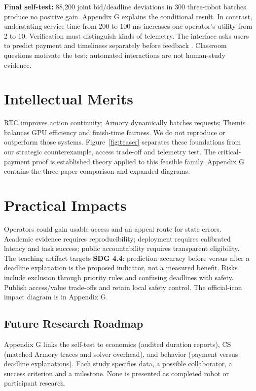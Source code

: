 \textbf{Final self-test:} 88,200 joint bid/deadline deviations in 300 three-robot batches produce no positive gain. Appendix G explains the conditional result. In contrast, understating service time from 200 to 100 ms increases one operator's utility from 2 to 10. Verification must distinguish kinds of telemetry. The interface asks users to predict payment and timeliness separately before feedback \cite{hassidim}. Classroom questions motivate the test; automated interactions are not human-study evidence.

\balance
\section{Intellectual Merits}
RTC improves action continuity; Armory dynamically batches requests; Themis balances GPU efficiency and finish-time fairness. We do not reproduce or outperform those systems. Figure~\ref{fig:teaser} separates these foundations from our strategic counterexample, access trade-off and telemetry test. The critical-payment proof is established theory applied to this feasible family. Appendix G contains the three-paper comparison and expanded diagrams.

\section{Practical Impacts}
Operators could gain usable access and an appeal route for state errors. Academic evidence requires reproducibility; deployment requires calibrated latency and task success; public accountability requires transparent eligibility. The teaching artifact targets \textbf{SDG 4.4}: prediction accuracy before versus after a deadline explanation is the proposed indicator, not a measured benefit. Risks include exclusion through priority rules and confusing deadlines with safety. Publish access/value trade-offs and retain local safety control. The official-icon impact diagram is in Appendix G.

\subsection*{Future Research Roadmap}
Appendix G links the self-test to economics (audited duration reports), CS (matched Armory traces and solver overhead), and behavior (payment versus deadline explanations). Each study specifies data, a possible collaborator, a success criterion and a milestone. None is presented as completed robot or participant research.

